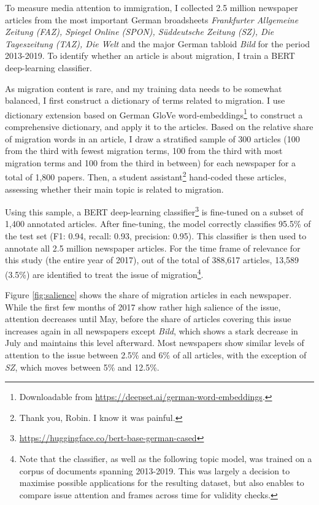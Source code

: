 \documentclass{article}
\begin{document}
To measure media attention to immigration, I collected 2.5 million newspaper articles from the most important German broadsheets \textit{Frankfurter Allgemeine Zeitung (FAZ), Spiegel Online (SPON), Süddeutsche Zeitung (SZ), Die Tageszeitung (TAZ), Die Welt} and the major German tabloid \textit{Bild} for the period 2013-2019. To identify whether an article is about migration, I train a BERT deep-learning classifier. 

As migration content is rare, and my training data needs to be somewhat balanced, I first construct a dictionary of terms related to migration. I use dictionary extension based on German GloVe word-embeddings\footnote{Downloadable from \url{https://deepset.ai/german-word-embeddings}.} to construct a comprehensive dictionary, and apply it to the articles. Based on the relative share of migration words in an article, I draw a stratified sample of 300 articles (100 from the third with fewest migration terms, 100 from the third with most migration terms and 100 from the third in between) for each newspaper for a total of 1,800 papers. Then, a student assistant\footnote{Thank you, Robin. I know it was painful.} hand-coded these articles, assessing whether their main topic is related to migration. 

Using this sample, a BERT deep-learning classifier\footnote{\url{https://huggingface.co/bert-base-german-cased}} is fine-tuned on a subset of 1,400 annotated articles. After fine-tuning, the model correctly classifies 95.5\% of the test set (F1: 0.94, recall: 0.93, precision: 0.95). This classifier is then used to annotate all 2.5 million newspaper articles. For the time frame of relevance for this study (the entire year of 2017), out of the total of 388,617 articles, 13,589 (3.5\%) are identified to treat the issue of migration\footnote{Note that the classifier, as well as the following topic model, was trained on a corpus of documents spanning 2013-2019. This was largely a decision to maximise possible applications for the resulting dataset, but also enables to compare issue attention and frames across time for validity checks.}.


Figure \ref{fig:salience} shows the share of migration articles in each newspaper. While the first few months of 2017 show rather high salience of the issue, attention decreases until May, before the share of articles covering this issue increases again in all newspapers except \textit{Bild}, which shows a stark decrease in July and maintains this level afterward. Most newspapers show similar levels of attention to the issue between 2.5\% and 6\% of all articles, with the exception of \textit{SZ}, which moves between 5\% and 12.5\%.
\end{document}
